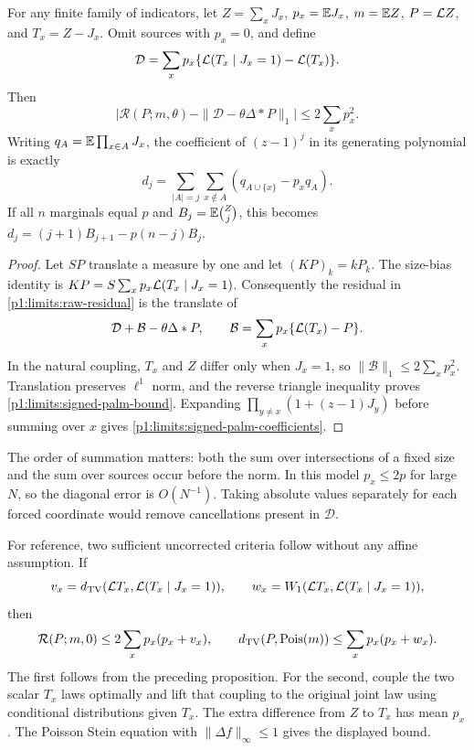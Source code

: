 \begin{proposition}
\label{p1:limits:signed-palm}
For any finite family of indicators, let $Z=\sum_xJ_x$,
$p_x=\mathbb E J_x$, $m=\mathbb E Z$, $P=\mathcal L Z$, and $T_x=Z-J_x$.
Omit sources with $p_x=0$, and define
\[
 \mathcal D=\sum_xp_x
       \{\mathcal L(T_x\mid J_x=1)-\mathcal L(T_x)\}.
\]
Then
\begin{equation}
 \big|\mathcal R(P;m,\theta)
       -\|\mathcal D-\theta\Delta*P\|_1\big|
       \le2\sum_xp_x^2.
 \label{p1:limits:signed-palm-bound}
\end{equation}
Writing $q_A=\mathbb E\prod_{x\in A}J_x$, the coefficient of
$(z-1)^j$ in its generating polynomial is exactly
\begin{equation}
 d_j=\sum_{|A|=j}\sum_{x\notin A}(q_{A\cup\{x\}}-p_xq_A).
 \label{p1:limits:signed-palm-coefficients}
\end{equation}
If all $n$ marginals equal $p$ and
$B_j=\mathbb E\binom Zj$, this becomes
$d_j=(j+1)B_{j+1}-p(n-j)B_j$.
\end{proposition}
\begin{proof}
Let $SP$ translate a measure by one and let $(KP)_k=kP_k$.
The size-bias identity is
$KP=S\sum_xp_x\mathcal L(T_x\mid J_x=1)$.
Consequently the residual in \eqref{p1:limits:raw-residual}
is the translate of
\[
 \mathcal D+\mathcal B-\theta\Delta*P,\qquad
 \mathcal B=\sum_xp_x\{\mathcal L(T_x)-P\}.
\]
In the natural coupling, $T_x$ and $Z$ differ only when
$J_x=1$, so $\|\mathcal B\|_1\le2\sum_xp_x^2$.
Translation preserves $\ell^1$ norm, and the reverse triangle
inequality proves \eqref{p1:limits:signed-palm-bound}.
Expanding $\prod_{y\ne x}(1+(z-1)J_y)$ before summing over
$x$ gives \eqref{p1:limits:signed-palm-coefficients}.
\end{proof}

The order of summation matters: both the sum over intersections
of a fixed size and the sum over sources occur before the norm.
In this model $p_x\le2p$ for large $N$, so the diagonal error is
$O(N^{-1})$.  Taking absolute values separately for each
forced coordinate would remove cancellations present in
$\mathcal D$.

For reference, two sufficient uncorrected criteria follow without
any affine assumption.  If
\[
 v_x=d_{\mathrm{TV}}(\mathcal L T_x,\mathcal L(T_x\mid J_x=1)),\qquad
 w_x=W_1(\mathcal L T_x,\mathcal L(T_x\mid J_x=1)),
\]
then
\begin{equation}
 \mathcal R(P;m,0)\le2\sum_xp_x(p_x+v_x),\qquad
 d_{\mathrm{TV}}(P,\operatorname{Pois}(m))\le\sum_xp_x(p_x+w_x).
 \label{p1:limits:palm-sufficient}
\end{equation}
The first follows from the preceding proposition.  For the
second, couple the two scalar $T_x$ laws optimally and lift
that coupling to the original joint law using conditional
distributions given $T_x$.  The extra difference from $Z$ to
$T_x$ has mean $p_x$.  The Poisson Stein equation with
$\|\Delta f\|_\infty\le1$ gives the displayed bound.

